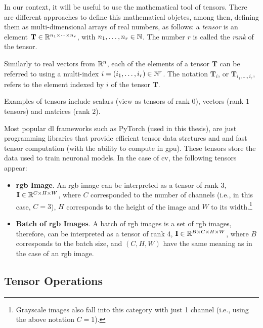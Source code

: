 In our context, it will be useful to use the mathematical tool of
tensors. There are different approaches to define this mathematical objetcs,
among then, defining them as multi-dimensional arrays of real numbers, as
follows: a \emph{tensor} is an element
\(\mathbf{T} \in \mathbb{R}^{n_1 \times \cdots \times n_r}\), with
\(n_1, \ldots, n_r \in \mathbb{N}\). The number \(r\) is called the \emph{rank} of the
tensor.

Similarly to real vectors from \(\mathbb{R}^n\), each of the elements of a tensor
\(\mathbf{T}\) can be referred to using a multi-index
\(i = (i_1, \ldots, i_r) \in \mathbb{N}^r\). The notation \(\mathbf{T}_i\), or
\(\mathbf{T}_{i_1, \ldots, i_r}\), refers to the element indexed by \(i\) of
the tensor \(\mathbf{T}\).

\begin{exampleBox}
  Examples of tensors include scalars (view as tensors of rank \(0\)), vectors
  (rank \(1\) tensors) and matrices (rank \(2\)).
\end{exampleBox}

Most popular \gls{dl} frameworks such as PyTorch (used in this thesis), are
just programming libraries that provide efficient tensor data strctures and and
fast tensor computation (with the ability to compute in \gls{gpu}). These
tensors store the data used to train neuronal models. In the case of \gls{cv},
the following tensors appear:
\begin{itemize}
  \item \textbf{\acs*{rgb} Image}. An \acs{rgb} image can be interpreted as a
  tensor of rank 3, \(\mathbf{I} \in \mathbb{R}^{C \times H \times W}\), where \(C\)
  corresponded to the number of channels (i.e., in this case, \(C = 3\)), \(H\)
  corresponds to the height of the image and \(W\) to its
  width.\footnote{Grayscale images also fall into this category with just 1
    channel (i.e., using the above notation \(C = 1\)).}
  \item \textbf{Batch of \acs*{rgb} Images}. A batch of \acs{rgb} images is a
  set of \acs{rgb} images, therefore, can be interpreted as a tensor of rank 4,
  \(\mathbf{I} \in \mathbb{R}^{B \times C \times H \times W}\), where \(B\) corresponds
  to the batch size, and \((C, H, W)\) have the same meaning as in the case of
  an \acs{rgb} image.
\end{itemize}


\subsection{Tensor Operations}

